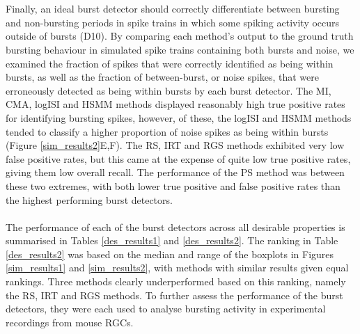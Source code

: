 \documentclass[12pt, titlepage]{article}
\begin{document}
	\\ \\ Finally, an ideal burst detector should correctly differentiate between bursting and non-bursting periods in spike trains in which some spiking activity occurs outside of bursts (D10). By comparing each method's output to the ground truth bursting behaviour in simulated spike trains containing both bursts and noise, we examined the fraction of spikes that were correctly identified as being within bursts, as well as the fraction of between-burst, or noise spikes, that were erroneously detected as being within bursts by each burst detector.
	The MI, CMA, logISI and HSMM methods displayed reasonably high true positive rates for identifying bursting spikes, however, of these, the logISI and HSMM methods tended to classify a higher proportion of noise spikes as being within bursts (Figure \ref{sim_results2}E,F). The RS, IRT and RGS methods exhibited very low false positive rates, but this came at the expense of quite low true positive rates, giving them low overall recall. The performance of the PS method was between these two extremes, with both lower true positive and false positive rates than the highest performing burst detectors.
	\\ \\ The performance of each of the burst detectors across all desirable properties is summarised in Tables \ref{des_results1} and \ref{des_results2}. The ranking in Table \ref{des_results2} was based on the median and range of the boxplots in Figures \ref{sim_results1} and \ref{sim_results2}, with methods with similar results given equal rankings. Three methods clearly underperformed based on this ranking, namely the RS, IRT and RGS methods. To further assess the performance of the burst detectors, they were each used to analyse bursting activity in experimental recordings from mouse RGCs.
\end{document}
